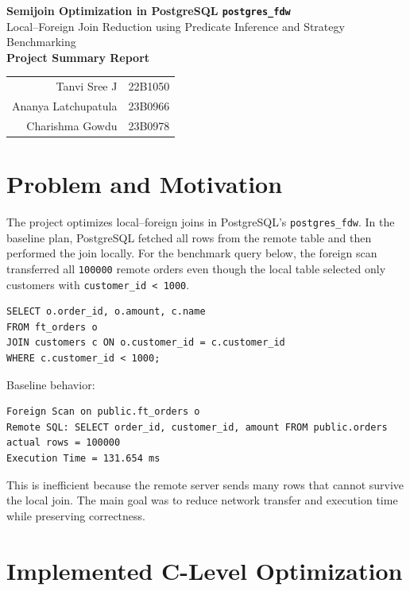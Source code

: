 \documentclass[10pt,a4paper]{article}
\begin{document}
\begin{center}
    {\LARGE \textbf{Semijoin Optimization in PostgreSQL \texttt{postgres\_fdw}}}\\[-1pt]
    {\large Local--Foreign Join Reduction using Predicate Inference and Strategy Benchmarking}\\[3pt]
    \textbf{Project Summary Report}\\[6pt]
    \begin{tabular}{rl}
        Tanvi Sree J & 22B1050 \\
        Ananya Latchupatula & 23B0966 \\
        Charishma Gowdu & 23B0978
    \end{tabular}
\end{center}

\section{Problem and Motivation}

The project optimizes local--foreign joins in PostgreSQL's \texttt{postgres\_fdw}. In the baseline plan, PostgreSQL fetched all rows from the remote table and then performed the join locally. For the benchmark query below, the foreign scan transferred all \texttt{100000} remote orders even though the local table selected only customers with \texttt{customer\_id < 1000}.

\begin{lstlisting}[style=sqlstyle]
SELECT o.order_id, o.amount, c.name
FROM ft_orders o
JOIN customers c ON o.customer_id = c.customer_id
WHERE c.customer_id < 1000;
\end{lstlisting}

Baseline behavior:

\begin{lstlisting}[style=sqlstyle]
Foreign Scan on public.ft_orders o
Remote SQL: SELECT order_id, customer_id, amount FROM public.orders
actual rows = 100000
Execution Time = 131.654 ms
\end{lstlisting}

This is inefficient because the remote server sends many rows that cannot survive the local join. The main goal was to reduce network transfer and execution time while preserving correctness.

\section{Implemented C-Level Optimization}
\end{document}
